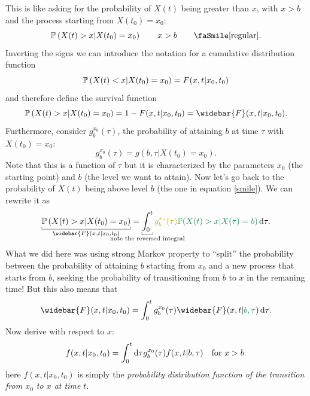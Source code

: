 \documentclass[12pt]{report}
\begin{document}
This is like asking for the probability of $X(t)$ being greater than $x$, with $x>b$ and the process starting from $X(t_{0})=x_{0}$:
\begin{equation*}
	\pr\left(X(t)>x|X(t_{0})=x_{0}\right)\qquad x>b\tag*{\faSmile[regular]}\label{smile}.
\end{equation*}
Inverting the signs we can introduce the notation for a cumulative distribution function
\begin{equation*}
	\mathbb{P}\left(X({t})<x|X(t_{0})=x_{0}\right)=F(x,t|x_{0},t_{0})
\end{equation*}
and therefore define the survival function
\begin{equation*}
		\pr\left(X(t)>x|X(t_{0})=x_{0}\right)=1-F(x,t|x_{0},t_{0})=\widebar{F}(x,t|x_{0},t_{0}).
\end{equation*}
Furthermore, consider $g_{b}^{x_{0}}(\tau)$, the probability of attaining $b$ at time $\tau$ with $X(t_0)=x_{0}$:
\begin{equation*}
	g_{b}^{x_{0}}(\tau)=g(b,\tau|X(t_{0})=x_{0}).
\end{equation*}
Note that this is a function of $\tau$ but it is characterized by the parameters $x_0$ (the starting point) and $b$ (the level we want to attain).
Now let's go back to the probability of $X(t)$ being above level $b$ (the one in equation \ref{smile}). We can rewrite it as
\begin{equation*}
	\ubracketthin{\pr\left(X({t})>x|X(t_{0})=x_{0}\right)}_{\widebar{F}(x,t|x_{0},t_{0})}=\ubracketthin{\int_{0}^{t}}_{\claptext{note the reversed integral}}\mathcolor{Gold3}{g_{b}^{x_{0}}(\tau)}\mathcolor{SpringGreen4}{\pr(X(t)>x|X(\tau)=b)}\dif\tau.
\end{equation*}
What we did here was using strong Markov property to ``split'' the probability between the \textcolor{Gold3}{probability of attaining $b$ starting from $x_0$} and \textcolor{SpringGreen4}{a new process that starts from $b$}, seeking the probability of transitioning from $b$ to $x$ in the remaning time! But this also means that
\begin{equation*}
	\widebar{F}(x,t|x_{0},t_{0})=\int_{0}^{t}g_{b}^{x_{0}}(\tau)\widebar{F}(x,t|\mathcolor{SpringGreen4}{b,\tau})\dif\tau.
\end{equation*}
Now derive with respect to $x$:
\begin{equation*}
	f(x,t|x_{0},t_{0})=\int_{0}^{t}\mathop{}\!\mathrm{d}\tau g_{b}^{x_{0}}(\tau)f(x,t|b,\tau)\quad\text{for }x>b.
\end{equation*}
here $f(x,t|x_{0},t_{0})$ is simply the \emph{probability distribution function of the transition from $x_{0}$ to $x$ at time $t$}.\par
\end{document}
